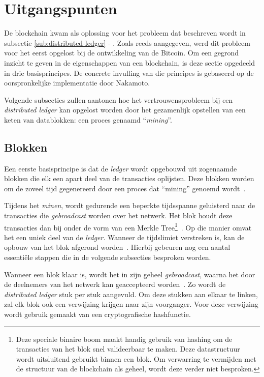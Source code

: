 \section{Uitgangspunten}
\label{sec:uitgangspunten}

De blockchain kwam als oplossing voor het probleem dat beschreven wordt in subsectie \ref{sub:distributed-ledger} - . Zoals reeds aangegeven, werd dit probleem voor het eerst opgelost bij de ontwikkeling van de Bitcoin. Om een gegrond inzicht te geven in de eigenschappen van een blockchain, is deze sectie opgedeeld in drie basisprincipes. De concrete invulling van die principes is gebaseerd op de oorspronkelijke implementatie door Nakamoto.

Volgende subsecties zullen aantonen hoe het vertrouwensprobleem bij een \textit{distributed ledger} kan opgelost worden door het gezamenlijk opstellen van een keten van datablokken: een proces genaamd ``\textit{mining}''.


\subsection{Blokken}
\label{sub:blokken}

Een eerste basisprincipe is dat de \textit{ledger} wordt opgebouwd uit zogenaamde blokken die elk een apart deel van de transacties oplijsten. Deze blokken worden om de zoveel tijd gegenereerd door een proces dat ``mining'' genoemd wordt~\autocite{Bhaskar2015}.

Tijdens het \textit{minen}, wordt gedurende een beperkte tijdsspanne geluisterd naar de transacties die \textit{gebroadcast} worden over het netwerk. Het blok houdt deze transacties dan bij onder de vorm van een Merkle Tree\footnote{Deze speciale binaire boom maakt handig gebruik van hashing om de transacties van het blok snel valideerbaar te maken. Deze datastructuur wordt uitsluitend gebruikt binnen een blok. Om verwarring te vermijden met de structuur van de blockchain als geheel, wordt deze verder niet besproken.}~\autocite{Salem2008}. Op die manier omvat het een uniek deel van de \textit{ledger}. Wanneer de tijdslimiet verstreken is, kan de opbouw van het blok afgerond worden~\autocite{Nakamoto2008}. Hierbij gebeuren nog een aantal essentiële stappen die in de volgende subsecties besproken worden. 

Wanneer een blok klaar is, wordt het in zijn geheel \textit{gebroadcast}, waarna het door de deelnemers van het netwerk kan geaccepteerd worden~\autocite{Nakamoto2008}. Zo wordt de \textit{distributed ledger} stuk per stuk aangevuld.
Om deze stukken aan elkaar te linken, zal elk blok ook een verwijzing krijgen naar zijn voorganger. Voor deze verwijzing wordt gebruik gemaakt van een cryptografische hashfunctie. 


